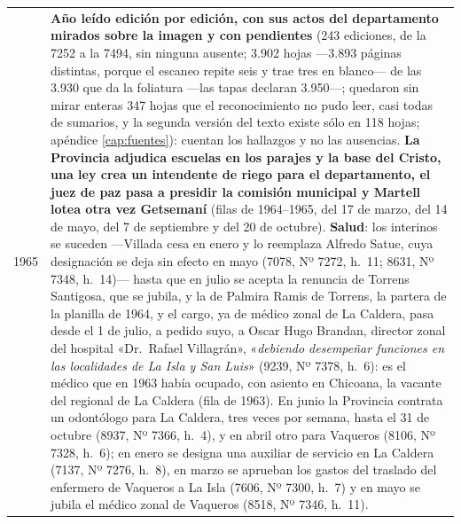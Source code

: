 \begin{longtable}{@{}p{2.7cm}p{10.3cm}@{}}
1965 & \textbf{Año leído edición por edición, con sus actos del departamento mirados sobre la imagen y con pendientes} (243 ediciones, de la 7252 a la 7494, sin ninguna ausente; 3.902 hojas ---3.893 páginas distintas, porque el escaneo repite seis y trae tres en blanco--- de las 3.930 que da la foliatura ---las tapas declaran 3.950---; quedaron sin mirar enteras 347 hojas que el reconocimiento no pudo leer, casi todas de sumarios, y la segunda versión del texto existe sólo en 118 hojas; apéndice \ref{cap:fuentes}): cuentan los hallazgos y no las ausencias. \textbf{La Provincia adjudica escuelas en los parajes y la base del Cristo, una ley crea un intendente de riego para el departamento, el juez de paz pasa a presidir la comisión municipal y Martell lotea otra vez Getsemaní} (filas de 1964--1965, del 17 de marzo, del 14 de mayo, del 7 de septiembre y del 20 de octubre). \textbf{Salud}: los interinos se suceden ---Villada cesa en enero y lo reemplaza Alfredo Satue, cuya designación se deja sin efecto en mayo (7078, Nº 7272, h.\ 11; 8631, Nº 7348, h.\ 14)--- hasta que en julio se acepta la renuncia de Torrens Santigosa, que se jubila, y la de Palmira Ramis de Torrens, la partera de la planilla de 1964, y el cargo, ya de médico zonal de La Caldera, pasa desde el 1 de julio, a pedido suyo, a Oscar Hugo Brandan, director zonal del hospital «Dr.\ Rafael Villagrán», «\textit{debiendo desempeñar funciones en las localidades de La Isla y San Luis}» (9239, Nº 7378, h.\ 6): es el médico que en 1963 había ocupado, con asiento en Chicoana, la vacante del regional de La Caldera (fila de 1963). En junio la Provincia contrata un odontólogo para La Caldera, tres veces por semana, hasta el 31 de octubre (8937, Nº 7366, h.\ 4), y en abril otro para Vaqueros (8106, Nº 7328, h.\ 6); en enero se designa una auxiliar de servicio en La Caldera (7137, Nº 7276, h.\ 8), en marzo se aprueban los gastos del traslado del enfermero de Vaqueros a La Isla (7606, Nº 7300, h.\ 7) y en mayo se jubila el médico zonal de Vaqueros (8518, Nº 7346, h.\ 11). \\

\end{longtable}
